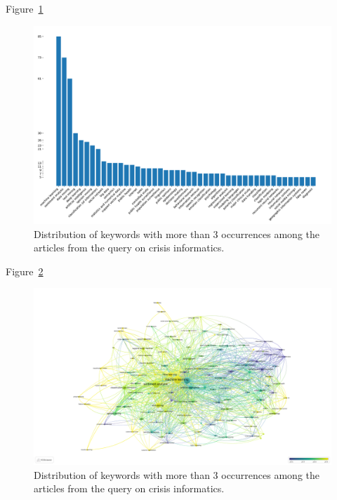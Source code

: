 Figure~\ref{literature:nlp-bar}

\begin{figure}[bp]
    \centering
    \includegraphics[width=\textwidth]{figures/chap-2/nlp-bar.pdf}
    \caption{Distribution of keywords with more than 3 occurrences among the articles from the query on crisis informatics. }
    \label{literature:nlp-bar}
\end{figure}

Figure~\ref{literature:nlp-overlay}

\begin{figure}[bp]
    \includegraphics[width=\paperwidth,height=\paperheight,keepaspectratio, angle=90]{figures/chap-2/nlp-overlay.pdf}
    \caption{Distribution of keywords with more than 3 occurrences among the articles from the query on crisis informatics. }
    \label{literature:nlp-overlay}
\end{figure}



